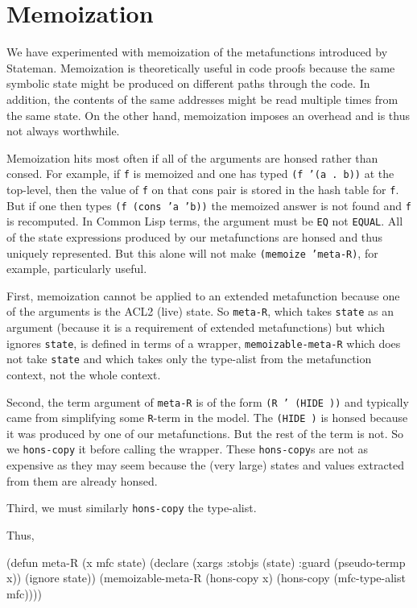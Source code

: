 \documentclass[submission,copyright,creativecommons]{eptcs}
\newcommand{\ptt}[1]{\tt{#1}}
\begin{document}
\section{Memoization}

We have experimented with memoization of the metafunctions introduced by Stateman.
Memoization is theoretically useful in code proofs because the same symbolic
state might be produced on different paths through the code.  In addition,
the contents of the same addresses might be read multiple times from the same state.
On the other hand, memoization imposes an overhead and is thus not always worthwhile.

Memoization hits most often if all of the arguments are honsed rather than
consed.  For example, if {\ptt{f}} is memoized and one has typed {\ptt{(f '(a . b))}} at the top-level,
then the value of {\ptt{f}} on that cons pair is stored in the hash table for {\ptt{f}}.  But if one then
types {\ptt{(f (cons 'a 'b))}} the memoized answer is not found and {\ptt{f}} is recomputed.
In Common Lisp terms, the argument must be {\ptt{EQ}} not
{\ptt{EQUAL}}.  All of the state expressions produced by our metafunctions
are honsed and thus uniquely represented.  But this alone will not make
{\ptt{(memoize 'meta-R)}}, for example, particularly useful.

First, memoization cannot be applied to an extended metafunction because one
of the arguments is the ACL2 (live) state.  So {\ptt{meta-R}}, which takes
{\ptt{state}} as an argument (because it is a requirement of extended
metafunctions) but which ignores {\ptt{state}}, is defined in terms of a wrapper,
{\ptt{memoizable-meta-R}} which does not take {\ptt{state}} and which takes
only the type-alist from the metafunction context, not the whole context.

Second, the term argument of {\ptt{meta-R}} is of the form {\ptt{(R  '
    (HIDE ))}} and typically came from simplifying some {\ptt{R}}-term
in the model.  The {\ptt{(HIDE )}} is honsed because it was produced by
one of our metafunctions.  But the rest of the term is not.  So we
{\ptt{hons-copy}} it before calling the wrapper.  These {\ptt{hons-copy}}s
are not as expensive as they may seem because the (very large) states and
values extracted from them are already honsed.

Third, we must similarly {\ptt{hons-copy}} the type-alist.

Thus, 
\begin{acl2p}
(defun meta-R (x mfc state)
  (declare (xargs :stobjs (state)
                  :guard (pseudo-termp x))
           (ignore state))
  (memoizable-meta-R (hons-copy x)
                     (hons-copy (mfc-type-alist mfc))))
\end{acl2p}
\end{document}
